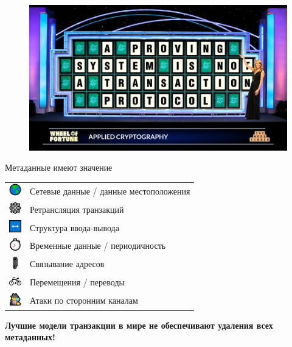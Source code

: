 \documentclass[aspectratio=169]{beamer}
\begin{document}
\begin{frame}
\begin{figure}
\includegraphics[width=\textwidth]{puzzle.jpeg}
\end{figure}
\end{frame}


\begin{frame}{Метаданные имеют значение}
\begin{table}
\centering
\begin{tabular}{>{\arraybackslash}m{0.3in} >{\arraybackslash}m{2.0in}}
\includegraphics[width=20px]{icon-earth.png} & Сетевые данные / данные местоположения \\
\includegraphics[width=20px]{icon-web.png} & Ретрансляция транзакций \\
\includegraphics[width=20px]{icon-arrows.png} & Структура ввода-вывода \\
\includegraphics[width=20px]{icon-stopwatch.png} & Временные данные / периодичность \\
\includegraphics[width=20px]{icon-clip.png} & Связывание адресов \\
\includegraphics[width=20px]{icon-bike.png} & Перемещения / переводы \\
\includegraphics[width=20px]{icon-spy.png} & Атаки по сторонним каналам
\end{tabular}
\end{table}

\begin{center}
\textbf{Лучшие модели транзакции в мире не обеспечивают удаления всех метаданных!}
\end{center}
\end{frame}
\end{document}
